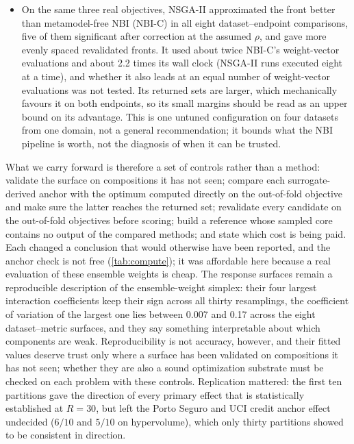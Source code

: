 \begin{itemize}
six candidate sets in 8 to 24 of 30 partitions, and several paired conclusions, including the UCI credit anchor
effect, reverse between them. Sets optimized on the linear relaxation omit the cheapest supports that the unoptimized
design contains, at a penalty whose size depends on the cost range that sets the normalization box. The step-cost
reference was less converged than the weighted-cost one, so part of that disagreement may be reference instability.
\item On the same three real objectives, NSGA-II approximated the front better than metamodel-free NBI (NBI-C) in all
eight dataset--endpoint comparisons, five of them significant after correction at the assumed $\rho$, and gave more evenly spaced
revalidated fronts. It used about twice NBI-C's weight-vector evaluations and about 2.2 times its wall clock (NSGA-II
runs executed eight at a time), and whether it also leads at an equal number of weight-vector evaluations was not
tested. Its returned sets are larger, which mechanically favours it on both endpoints, so its small margins should be
read as an upper bound on its advantage. This is one untuned configuration on four datasets from one domain, not a
general recommendation; it bounds what the NBI pipeline is worth, not the diagnosis of when it can be trusted.
\end{itemize}

What we carry forward is therefore a set of controls rather than a method: validate the surface on compositions it
has not seen; compare each surrogate-derived anchor with the optimum computed directly on the out-of-fold objective
and make sure the latter reaches the returned set; revalidate every candidate on the out-of-fold objectives before
scoring; build a reference whose sampled core contains no output of the compared methods; and state which cost is
being paid. Each changed a conclusion that would otherwise have been reported, and the anchor check is not free
(\cref{tab:compute}); it was affordable here because a real evaluation of these ensemble weights is cheap. The response surfaces remain a reproducible description of the ensemble-weight simplex: their
four largest interaction coefficients keep their sign across all thirty resamplings, the coefficient of variation of
the largest one lies between 0.007 and 0.17 across the eight dataset--metric surfaces, and they say something
interpretable about which components are weak. Reproducibility is not accuracy, however, and their fitted values
deserve trust only where a surface has been validated on compositions it has not seen; whether they are also a sound
optimization substrate must be checked on each problem with these controls. Replication mattered: the first ten
partitions gave the direction of every primary effect that is statistically established at $R = 30$, but left the
Porto Seguro and UCI credit anchor effect undecided ($6/10$ and $5/10$ on hypervolume), which only thirty partitions
showed to be consistent in direction.